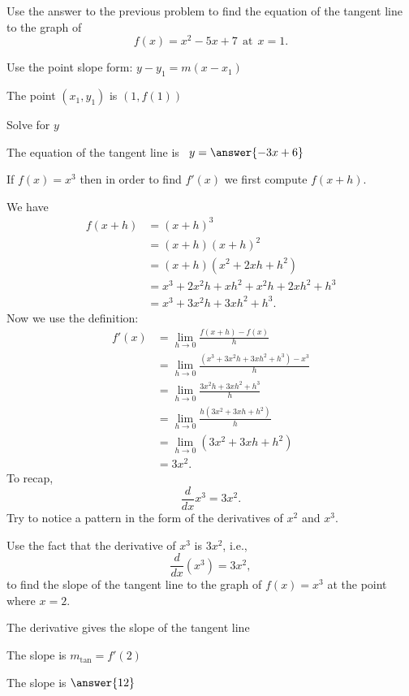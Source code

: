 \documentclass{ximera}
\begin{document}
\begin{problem} %
Use the answer to the previous problem to find the equation of the tangent line to the graph of 
\[
f(x) = x^2 - 5x + 7 \ \ \text{at} \ \ x=1.
\]
\begin{hint}
Use the point slope form: $y-y_1 = m(x-x_1)$
\end{hint}
\begin{hint}
The point $(x_1,y_1)$ is $(1, f(1))$
\end{hint}
\begin{hint}
Solve for $y$
\end{hint}
The equation of the tangent line is \ $y = \answer{-3x+6}$
\end{problem}


\begin{example} %
If $f(x) = x^3$ then in order to find $f'(x)$ we first compute $f(x+h)$.

We have
\begin{align*}
f(x+h) &= (x+h)^3  \\
       &= (x+h)(x+h)^2 \\
			&= (x+h)(x^2 + 2xh + h^2)\\
			&= x^3 + 2x^2h + xh^2 + x^2h + 2xh^2 + h^3\\
			&= x^3 + 3x^2h + 3xh^2 + h^3.
\end{align*}
Now we use the definition:
\begin{align*}
f'(x) &= \lim_{h \to 0} \frac{f(x+h)-f(x)}{h}\\[5pt]
&= \lim_{h \to 0} \frac{(x^3 + 3x^2h + 3xh^2 + h^3)- x^3}{h}\\[5pt]
&= \lim_{h \to 0} \frac{3x^2h + 3xh^2 + h^3}{h}\\[5pt]
&= \lim_{h \to 0} \frac{h(3x^2 + 3xh + h^2)}{h}\\[5pt]
&= \lim_{h \to 0} (3x^2 + 3xh + h^2) \\
&= 3x^2.
\end{align*}
To recap, 
\[
\frac{d}{dx}x^3 = 3x^2.
\]
Try to notice a pattern in the form of the derivatives of $x^2$ and $x^3$.

\end{example}


\begin{problem} %
Use the fact that the derivative of $x^3$ is $3x^2$,
i.e., 
\[
\frac{d}{dx}\left( x^3 \right) = 3x^2,
\]
to find the slope of the tangent line to the graph of 
$f(x) = x^3$ at the point where $x = 2$.\\
\begin{hint}
The derivative gives the slope of the tangent line
\end{hint}
\begin{hint}
The slope is $m_{\text{tan}} = f'(2)$
\end{hint}
The slope is $\answer{12}$
\end{problem}
\end{document}
